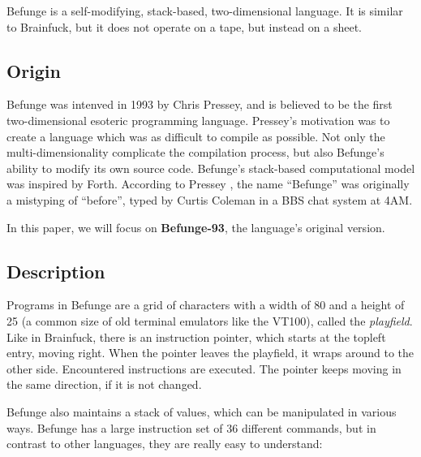 Befunge is a self-modifying, stack-based, two-dimensional language. It is similar to Brainfuck, but it does not operate on a tape, but instead on a sheet.

\subsection{Origin}

Befunge was intenved in 1993 by Chris Pressey, and is believed to be the first two-dimensional esoteric programming language. Pressey's motivation was to create a language which was as difficult to compile as possible. Not only the multi-dimensionality complicate the compilation process, but also Befunge's ability to modify its own source code. Befunge's stack-based computational model was inspired by Forth. According to Pressey \cite{pressey_coleman}, the name “Befunge” was originally a mistyping of “before”, typed by Curtis Coleman in a BBS chat system at 4AM.

In this paper, we will focus on \textbf{Befunge-93}, the language's original version.

\subsection{Description}

Programs in Befunge are a grid of \ascii{} characters with a width of 80 and a height of 25 (a common size of old terminal emulators like the VT100), called the \emph{playfield}. Like in Brainfuck, there is an instruction pointer, which starts at the topleft entry, moving right. When the pointer leaves the playfield, it wraps around to the other side. Encountered instructions are executed. The pointer keeps moving in the same direction, if it is not changed.

Befunge also maintains a stack of values, which can be manipulated in various ways. Befunge has a large instruction set of 36 different commands, but in contrast to other languages, they are really easy to understand:

